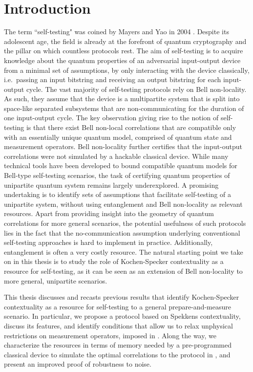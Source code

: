 \chapter{Introduction}
The term ``self-testing" was coined by Mayers and Yao in 2004 \cite{Mayers2003}. Despite its adolescent age, the field is already at the forefront of quantum cryptography and the pillar on which countless protocols rest. The aim of self-testing is to acquire knowledge about the quantum properties of an adversarial input-output device from a minimal set of assumptions, by only interacting with the device classically, i.e.\ passing an input bitstring and receiving an output bitstring for each input-output cycle. The vast majority of self-testing protocols rely on Bell non-locality. As such, they assume that the device is a multipartite system that is split into space-like separated subsystems that are non-communicating for the duration of one input-output cycle. The key observation giving rise to the notion of self-testing is that there exist Bell non-local correlations that are compatible only with an essentially unique quantum model, comprised of quantum state and measurement operators. Bell non-locality further certifies that the input-output correlations were not simulated by a hackable classical device. While
many technical tools have been developed to bound compatible quantum models for Bell-type self-testing scenarios, the task of certifying quantum properties of unipartite quantum system remains largely underexplored. A promising undertaking is to identify sets of assumptions that facilitate self-testing of a unipartite system, without using entanglement and Bell non-locality as relevant resources. Apart from providing insight into the geometry of quantum correlations for more general scenarios, the potential usefulness of such protocols lies in the fact that the no-communication assumption underlying conventional self-testing approaches is hard to implement in practice. Additionally, entanglement is often a very costly resource. The natural starting point we take on in this thesis is to study the role of Kochen-Specker contextuality as a resource for self-testing, as it can be seen as an extension of Bell non-locality to more general, unipartite scenarios. 

This thesis discusses and recasts previous results \cite{Bharti2019} that identify Kochen-Specker contextuality as a resource for self-testing to a general prepare-and-measure scenario. In particular, we propose a protocol based on Spekkens contextuality, discuss its features, and identify conditions that allow us to relax unphysical restrictions on measurement operators, imposed in \cite{Bharti2019}. Along the way, we characterize the resources in terms of memory needed by a pre-programmed classical device to simulate the optimal correlations to the protocol in \cite{Bharti2019}, and present an improved proof of robustness to noise.

